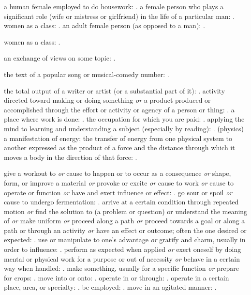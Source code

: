   a human female employed to do housework: . a female person who plays a significant role (wife or mistress or girlfriend) in the life of a particular man: . women as a class: . an adult female person (as opposed to a man): .

  women as a class: .

  an exchange of views on some topic: .

  the text of a popular song or musical-comedy number: .

  the total output of a writer or artist (or a substantial part of it): . activity directed toward making or doing something \textit{or} a product produced or accomplished through the effort or activity or agency of a person or thing: . a place where work is done: . the occupation for which you are paid: . applying the mind to learning and understanding a subject (especially by reading): . (physics) a manifestation of energy; the transfer of energy from one physical system to another expressed as the product of a force and the distance through which it moves a body in the direction of that force: .

  give a workout to \textit{or} cause to happen or to occur as a consequence \textit{or} shape, form, or improve a material \textit{or} provoke or excite \textit{or} cause to work \textit{or} cause to operate or function \textit{or} have and exert influence or effect: . go sour or spoil \textit{or} cause to undergo fermentation: . arrive at a certain condition through repeated motion \textit{or} find the solution to (a problem or question) or understand the meaning of \textit{or} make uniform \textit{or} proceed along a path \textit{or} proceed towards a goal or along a path or through an activity \textit{or} have an effect or outcome; often the one desired or expected: . use or manipulate to one's advantage \textit{or} gratify and charm, usually in order to influence: . perform as expected when applied \textit{or} exert oneself by doing mental or physical work for a purpose or out of necessity \textit{or} behave in a certain way when handled: . make something, usually for a specific function \textit{or} prepare for crops: . move into or onto: . operate in or through: . operate in a certain place, area, or specialty: . be employed: . move in an agitated manner: .

